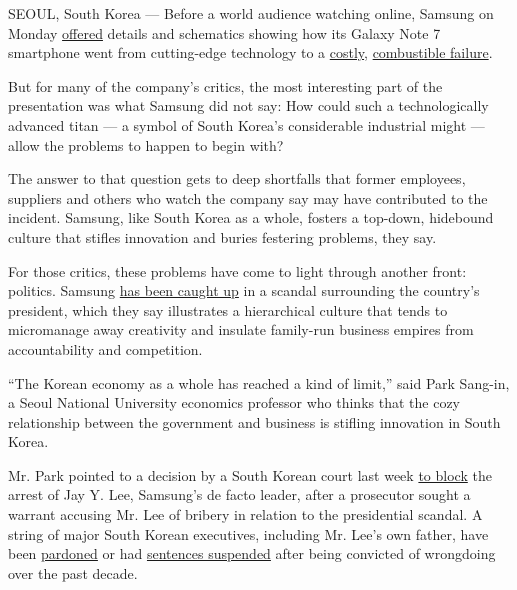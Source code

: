 SEOUL, South Korea --- Before a world audience watching online, Samsung
on Monday
\href{https://www.nytimes.com/2017/01/22/business/samsung-galaxy-note-7-battery-fires-report.html}{offered}
details and schematics showing how its Galaxy Note 7 smartphone went
from cutting-edge technology to a
\href{https://www.nytimes.com/2016/10/28/business/samsung-galaxy-note-7-profit.html}{costly},
\href{https://www.nytimes.com/2016/10/12/business/international/samsung-galaxy-note7-terminated.html}{combustible
failure}.

But for many of the company's critics, the most interesting part of the
presentation was what Samsung did not say: How could such a
technologically advanced titan --- a symbol of South Korea's
considerable industrial might --- allow the problems to happen to begin
with?

The answer to that question gets to deep shortfalls that former
employees, suppliers and others who watch the company say may have
contributed to the incident. Samsung, like South Korea as a whole,
fosters a top-down, hidebound culture that stifles innovation and buries
festering problems, they say.

For those critics, these problems have come to light through another
front: politics. Samsung
\href{https://www.nytimes.com/2017/01/15/world/asia/south-korea-samsung-arrest-jay-lee-park-geun-hye.html}{has
been caught up} in a scandal surrounding the country's president, which
they say illustrates a hierarchical culture that tends to micromanage
away creativity and insulate family-run business empires from
accountability and competition.

``The Korean economy as a whole has reached a kind of limit,'' said Park
Sang-in, a Seoul National University economics professor who thinks that
the cozy relationship between the government and business is stifling
innovation in South Korea.

Mr. Park pointed to a decision by a South Korean court last week
\href{https://www.nytimes.com/2017/01/18/world/asia/samsung-korea-president-impeachment.html}{to
block} the arrest of Jay Y. Lee, Samsung's de facto leader, after a
prosecutor sought a warrant accusing Mr. Lee of bribery in relation to
the presidential scandal. A string of major South Korean executives,
including Mr. Lee's own father, have been
\href{http://www.nytimes.com/2009/12/30/business/global/30samsung.html}{pardoned}
or had
\href{http://www.nytimes.com/2008/07/16/business/worldbusiness/16iht-samsung.1.14535273.html}{sentences
suspended} after being convicted of wrongdoing over the past decade.

